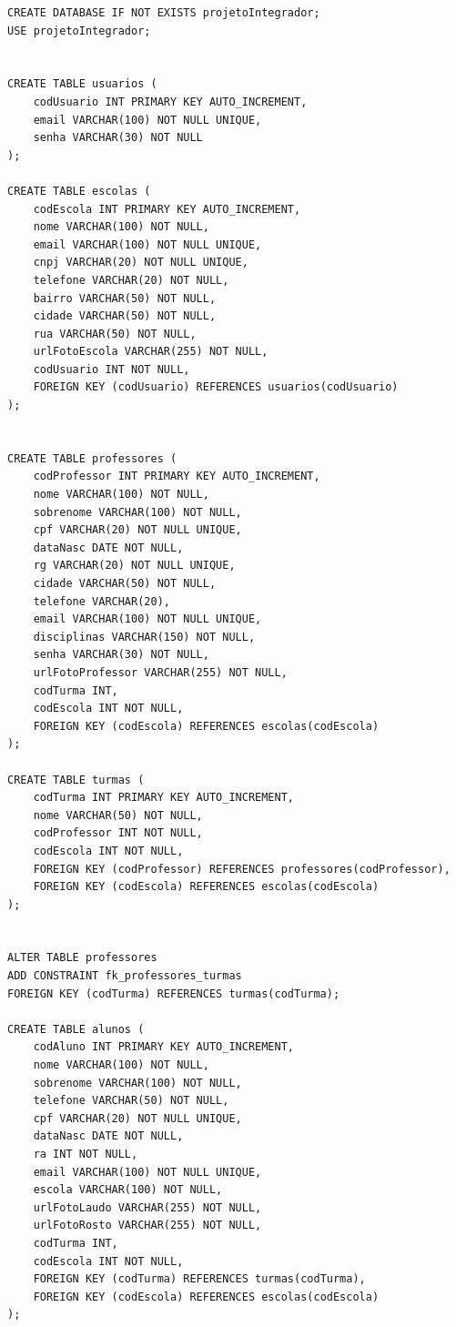 \documentclass[
  a4paper,
  12pt,
  english,
  brazilian,
]{article}
\begin{document}
\begin{lstlisting}[style=SQLstyle, caption={Script de criação do banco de dados}]
CREATE DATABASE IF NOT EXISTS projetoIntegrador;
USE projetoIntegrador;


CREATE TABLE usuarios (
    codUsuario INT PRIMARY KEY AUTO_INCREMENT,
    email VARCHAR(100) NOT NULL UNIQUE,
    senha VARCHAR(30) NOT NULL
);

CREATE TABLE escolas (
    codEscola INT PRIMARY KEY AUTO_INCREMENT,
    nome VARCHAR(100) NOT NULL,
    email VARCHAR(100) NOT NULL UNIQUE,
    cnpj VARCHAR(20) NOT NULL UNIQUE,
    telefone VARCHAR(20) NOT NULL,
    bairro VARCHAR(50) NOT NULL,
    cidade VARCHAR(50) NOT NULL,
    rua VARCHAR(50) NOT NULL,
    urlFotoEscola VARCHAR(255) NOT NULL,
    codUsuario INT NOT NULL,
    FOREIGN KEY (codUsuario) REFERENCES usuarios(codUsuario)
);


CREATE TABLE professores (
    codProfessor INT PRIMARY KEY AUTO_INCREMENT,
    nome VARCHAR(100) NOT NULL,
    sobrenome VARCHAR(100) NOT NULL,
    cpf VARCHAR(20) NOT NULL UNIQUE,
    dataNasc DATE NOT NULL,
    rg VARCHAR(20) NOT NULL UNIQUE,
    cidade VARCHAR(50) NOT NULL,
    telefone VARCHAR(20),
    email VARCHAR(100) NOT NULL UNIQUE,
    disciplinas VARCHAR(150) NOT NULL,
    senha VARCHAR(30) NOT NULL,
    urlFotoProfessor VARCHAR(255) NOT NULL,
    codTurma INT,
    codEscola INT NOT NULL,
    FOREIGN KEY (codEscola) REFERENCES escolas(codEscola)
);

CREATE TABLE turmas (
    codTurma INT PRIMARY KEY AUTO_INCREMENT,
    nome VARCHAR(50) NOT NULL,
    codProfessor INT NOT NULL,
    codEscola INT NOT NULL,
    FOREIGN KEY (codProfessor) REFERENCES professores(codProfessor),
    FOREIGN KEY (codEscola) REFERENCES escolas(codEscola)
);


ALTER TABLE professores
ADD CONSTRAINT fk_professores_turmas
FOREIGN KEY (codTurma) REFERENCES turmas(codTurma);

CREATE TABLE alunos (
    codAluno INT PRIMARY KEY AUTO_INCREMENT,
    nome VARCHAR(100) NOT NULL,
    sobrenome VARCHAR(100) NOT NULL,
    telefone VARCHAR(50) NOT NULL,
    cpf VARCHAR(20) NOT NULL UNIQUE,
    dataNasc DATE NOT NULL,
    ra INT NOT NULL,
    email VARCHAR(100) NOT NULL UNIQUE,
    escola VARCHAR(100) NOT NULL,
    urlFotoLaudo VARCHAR(255) NOT NULL,
    urlFotoRosto VARCHAR(255) NOT NULL,
    codTurma INT,
    codEscola INT NOT NULL,
    FOREIGN KEY (codTurma) REFERENCES turmas(codTurma),
    FOREIGN KEY (codEscola) REFERENCES escolas(codEscola)
);


\end{lstlisting}
\end{document}
